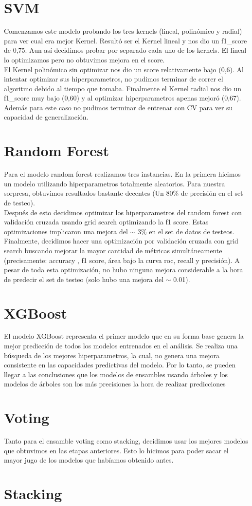 \documentclass{article}
\begin{document}
\section*{SVM} 

Comenzamos este modelo probando los tres kernels (lineal, polinómico y radial) para ver cual era mejor Kernel. Resultó ser el Kernel lineal y nos dio un f1\_score de 0,75. Aun así decidimos probar por separado cada uno de los kernels. El lineal lo optimizamos pero no obtuvimos mejora en el score. \\
El Kernel polinómico sin optimizar nos dio un score relativamente bajo (0,6). Al intentar optimizar sus hiperparametros, no pudimos terminar de correr el algoritmo debido al tiempo que tomaba. Finalmente el Kernel radial nos dio un f1\_score muy bajo (0,60) y al optimizar hiperparametros apenas mejoró (0,67). Además para este caso no pudimos terminar de entrenar con CV para ver su capacidad de generalización. 

\section*{Random Forest} 

Para el modelo random forest realizamos tres instancias. En la primera hicimos un modelo utilizando hiperparametros totalmente aleatorios. Para nuestra sorpresa, obtuvimos resultados bastante decentes (Un 80\% de precisión en el set de testeo).\\
Después de esto decidimos optimizar los hiperparametros del random forest con validación cruzada usando grid search optimizando la f1 score.  Estas optimizaciones implicaron una mejora del $\sim$ 3\% en el set de datos de testeos. Finalmente, decidimos hacer una optimización por validación cruzada con grid search buscando mejorar la mayor cantidad de métricas simultáneamente (precisamente: accuracy , f1 score, área bajo la curva roc, recall y precisión). A pesar de toda esta optimización, no hubo ninguna mejora considerable a la hora de predecir el set de testeo (solo hubo una mejora del $\sim$ 0.01). 

\section*{XGBoost} 

El modelo XGBoost representa el primer modelo que en su forma base genera la mejor predicción de todos los modelos entrenados en el análisis. Se realiza una búsqueda de los mejores hiperparametros, la cual, no genera una mejora consistente en las capacidades predictivas del modelo. Por lo tanto, se pueden llegar a las conclusiones que los modelos de ensambles usando árboles y los modelos de árboles son los más precisiones  la hora de realizar predicciones 

\section*{Voting} 
Tanto para el ensamble voting como stacking, decidimos usar los mejores modelos que obtuvimos en las etapas anteriores. Esto lo hicimos para poder sacar el mayor jugo de los modelos que habíamos obtenido antes. 

\section*{Stacking} 
\end{document}
